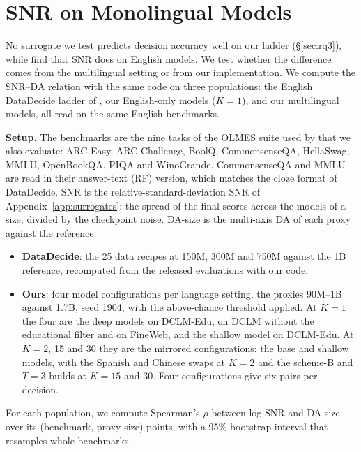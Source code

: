 \section{SNR on Monolingual Models}
\label{app:snr-monolingual}

No surrogate we test predicts decision accuracy well on our ladder (\S\ref{sec:rq3}), while \citet{heineman_signal_2025} find that SNR does on English models. We test whether the difference comes from the multilingual setting or from our implementation. We compute the SNR--DA relation with the same code on three populations: the English DataDecide ladder of \citet{heineman_signal_2025}, our English-only models ($K=1$), and our multilingual models, all read on the same English benchmarks.

\textbf{Setup.} The benchmarks are the nine tasks of the OLMES suite used by \citet{heineman_signal_2025} that we also evaluate: ARC-Easy, ARC-Challenge, BoolQ, CommonsenseQA, HellaSwag, MMLU, OpenBookQA, PIQA and WinoGrande. CommonsenseQA and MMLU are read in their answer-text (RF) version, which matches the cloze format of DataDecide. SNR is the relative-standard-deviation SNR of Appendix~\ref{app:surrogates}: the spread of the final scores across the models of a size, divided by the checkpoint noise. DA-size is the multi-axis DA of each proxy against the reference.
\begin{itemize}[leftmargin=*,itemsep=0pt,topsep=2pt]
    \item \textbf{DataDecide}: the 25 data recipes at 150M, 300M and 750M against the 1B reference, recomputed from the released evaluations with our code.
    \item \textbf{Ours}: four model configurations per language setting, the proxies 90M--1B against 1.7B, seed 1904, with the above-chance threshold applied. At $K=1$ the four are the deep models on DCLM-Edu, on DCLM without the educational filter and on FineWeb, and the shallow model on DCLM-Edu. At $K=2$, 15 and 30 they are the mirrored configurations: the base and shallow models, with the Spanish and Chinese swaps at $K=2$ and the scheme-B and $T=3$ builds at $K=15$ and 30. Four configurations give six pairs per decision.
\end{itemize}
For each population, we compute Spearman's $\rho$ between log SNR and DA-size over its (benchmark, proxy size) points, with a 95\% bootstrap interval that resamples whole benchmarks.

